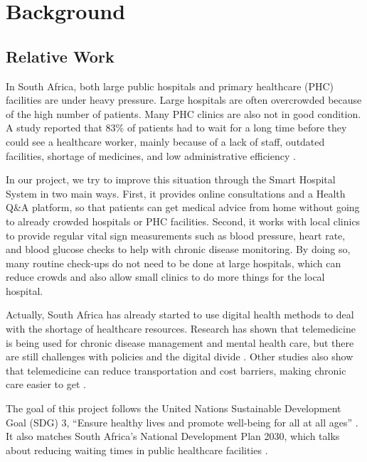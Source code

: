 %
%
\chapter{Background}
\label{chap:background}


\section{Relative Work}
\label{sec:relative-work}


In South Africa, both large public hospitals and primary healthcare (PHC) facilities are under heavy pressure. Large hospitals are often overcrowded because of the high number of patients. Many PHC clinics are also not in good condition. A study reported that 83\% of patients had to wait for a long time before they could see a healthcare worker, mainly because of a lack of staff, outdated facilities, shortage of medicines, and low administrative efficiency \cite{nwagbara2024}.

In our project, we try to improve this situation through the Smart Hospital System in two main ways. First, it provides online consultations and a Health Q\&A platform, so that patients can get medical advice from home without going to already crowded hospitals or PHC facilities. Second, it works with local clinics to provide regular vital sign measurements such as blood pressure, heart rate, and blood glucose checks to help with chronic disease monitoring. By doing so, many routine check-ups do not need to be done at large hospitals, which can reduce crowds and also allow small clinics to do more things for the local hospital.

Actually, South Africa has already started to use digital health methods to deal with the shortage of healthcare resources. Research has shown that telemedicine is being used for chronic disease management and mental health care, but there are still challenges with policies and the digital divide \cite{agbeyangi2025}. Other studies also show that telemedicine can reduce transportation and cost barriers, making chronic care easier to get \cite{sayani2019}.

The goal of this project follows the United Nations Sustainable Development Goal (SDG) 3, ``Ensure healthy lives and promote well-being for all at all ages'' \cite{sdg3}. It also matches South Africa's National Development Plan 2030, which talks about reducing waiting times in public healthcare facilities \cite{ndp2030guideline}.

